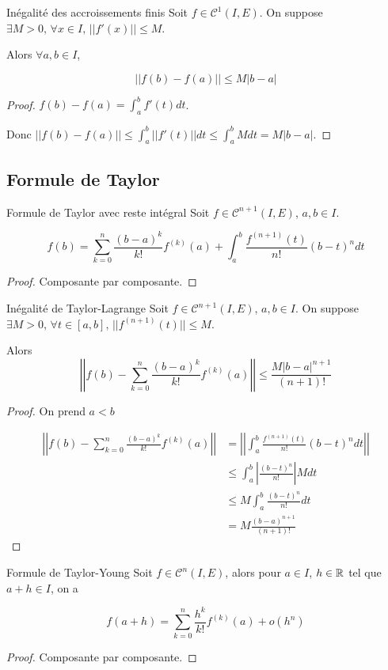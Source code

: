 \begin{theoreme}{Inégalité des accroissements finis}{}
    Soit $f \in \mathscr C^1(I, E)$. On suppose $\exists M > 0, \, \forall x \in I, \, ||f'(x)|| \leqslant M$.

    Alors $\forall a, b \in I$, 

    $$||f(b) - f(a)|| \leqslant M |b - a|$$
\end{theoreme}


\begin{proof}

    $f(b) - f(a) = \int_a^b f'(t) dt$.

    Donc $\displaystyle ||f(b) - f(a)|| \leqslant \int_a^b ||f'(t)|| dt \leqslant \int_a^b M dt = M |b - a|$.
\end{proof}


\subsection{Formule de Taylor }

\begin{proposition}{Formule de Taylor avec reste intégral}{}
    Soit $f \in \mathscr C^{n + 1}(I, E)$, $a, b \in I$. 

    $$f(b) = \sum_{k = 0 }^{n } \frac{(b - a)^k}{k!} f^{(k)}(a) + \int_a^b \frac{f^{(n + 1)}(t)}{n!} (b - t)^n dt$$
\end{proposition}

\begin{proof}
    Composante par composante.
\end{proof}

\begin{proposition}{Inégalité de Taylor-Lagrange}{}
    Soit $f \in \mathscr C^{n + 1}(I, E)$, $a, b \in I$. On suppose $\exists M > 0, \, \forall t \in [a, b], \, ||f^{(n + 1)}(t)|| \leqslant M$.

    Alors $$\left|\left| f(b) - \sum_{k = 0 }^{n } \frac{(b - a)^k}{k!} f^{(k)}(a) \right|\right| \leqslant \frac{M |b - a|^{n + 1}}{(n + 1)!}$$
\end{proposition}

\begin{proof}
    On prend $a < b$

    \begin{align*}
    \left|\left| f(b) - \sum_{k = 0}^n \frac{(b - a)^k}{k!} f^{(k)}(a) \right|\right|  & = \left|\left| \int_a^b \frac{f^{(n + 1)}(t)}{n!} (b - t)^n dt \right|\right| \\
     & \leqslant \int_a^b \left| \frac{(b - t)^n}{n!} \right| M dt \\
        & \leqslant M \int_{a }^{b } \frac{(b - t)^n}{n!} dt \\
        & = M \frac{(b - a )^{n + 1}}{(n+ 1)!}
    \end{align*}
\end{proof}

\begin{proposition}{Formule de Taylor-Young}{}
    Soit $f \in \mathscr C^n(I, E)$, alors pour $a \in I$, $h \in \mathbb{R}$ tel que $a + h \in I$, on a

    $$f(a + h) = \sum_{k = 0 }^{n } \frac{h^k}{k!} f^{(k)}(a) + o(h^n)$$
\end{proposition}

\begin{proof}
    Composante par composante.
\end{proof}




